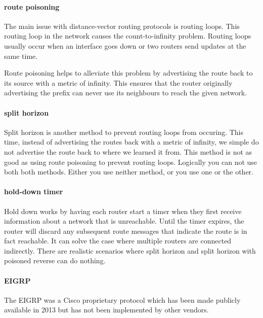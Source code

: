 \paragraph{route poisoning}
The main issue with distance-vector routing protocols is routing loops.%
This routing loop in the network causes the count-to-infinity problem.%
Routing loops usually occur when an interface goes down or two routers send updates at the same time.

Route poisoning helps to alleviate this problem by advertising the route back to its source with a metric of infinity.
This ensures that the router originally advertising the prefix can never use its neighbours to reach the given network.

\paragraph{split horizon}
Split horizon is another method to prevent routing loops from occuring.%
This time, instead of advertising the routes back with a metric of infinity, we simple do not advertise the route back to where we learned it from.
This method is not as good as using route poisoning to prevent routing loops.
Logically you can not use both both methods. Either you use neither method, or you use one or the other.

\paragraph{hold-down timer}
Hold down works by having each router start a timer when they first receive information about a network that is unreachable.
Until the timer expires, the router will discard any subsequent route messages that indicate the route is in fact reachable.
It can solve the case where multiple routers are connected indirectly.
There are realistic scenarios where split horizon and split horizon with poisoned reverse can do nothing.

\paragraph{\acf{EIGRP}}
The \acl{EIGRP} was a Cisco proprietary protocol which has been made publicly available in 2013 but has not been implemented by other vendors.

